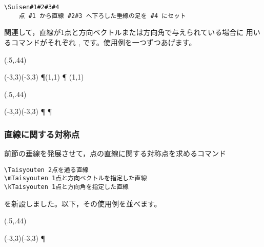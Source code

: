\begin{boxnote}
\begin{verbatim}
\Suisen#1#2#3#4
    点 #1 から直線 #2#3 へ下ろした垂線の足を #4 にセット
\end{verbatim}
\end{boxnote}

関連して，直線が1点と方向ベクトルまたは方向角で与えられている場合に
用いるコマンドがそれぞれ
,  です。使用例を一つずつあげます。

\begin{showEx}(.5,.44){}
\footnotesize
\begin{zahyou}(-3,3)(-3,3)
\def\houkouV{(1,1)}
\mSuisen\P\A\houkouV\Q
\kuromaru{\A;\P;\Q}
\Put{}
\Drawline{\P\Q}
\Tyokkakukigou\P\Q\A
\mTyokusen\A\houkouV{}{}
\end{zahyou}
\end{showEx}

\begin{showEx}(.5,.44){}
\footnotesize
\begin{zahyou}(-3,3)(-3,3)
\def\kaku{60}
\kSuisen\P\A\kaku\Q
\kuromaru{\A;\P;\Q}
\Put{}
\Drawline{\P\Q}\Tyokkakukigou\P\Q\A
\kTyokusen\A\kaku{}{}
\end{zahyou}
\end{showEx}

\subsubsection{直線に関する対称点}
前節の垂線を発展させて，点の直線に関する対称点を求めるコマンド
\begin{jquote}
\begin{verbatim}
\Taisyouten 2点を通る直線
\mTaisyouten 1点と方向ベクトルを指定した直線
\kTaisyouten 1点と方向角を指定した直線
\end{verbatim}
\end{jquote}
を新設しました。以下，その使用例を並べます。

\begin{showEx}(.5,.44){}
\footnotesize
\begin{zahyou}(-3,3)(-3,3)
\Taisyouten\P\A\B\Q
\kuromaru{\A;\B;\P;\Q}
\Put{}
\Drawline{\P\Q}
\Tyokusen\A\B{}{}
\end{zahyou}
\end{showEx}

